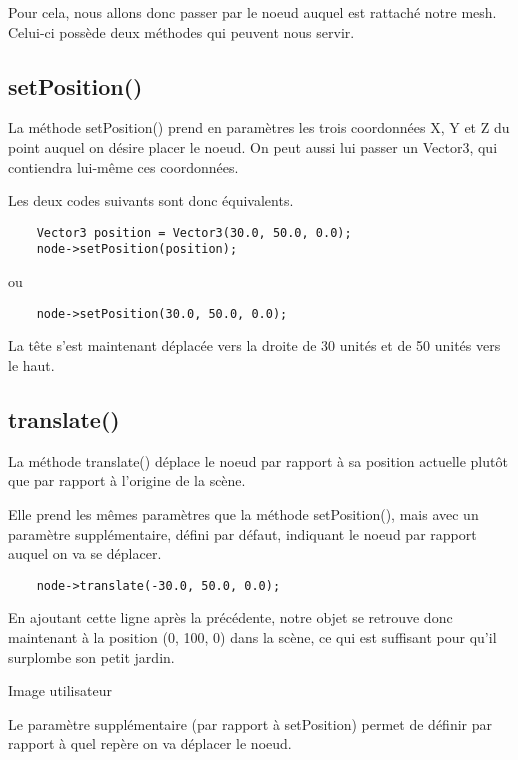 \documentclass[10pt,a4paper]{report}
\begin{document}
Pour cela, nous allons donc passer par le noeud auquel est rattach\'e notre mesh. Celui-ci poss\`ede deux m\'ethodes qui peuvent nous servir.




\subsection{setPosition()}

La m\'ethode setPosition() prend en param\`etres les trois coordonn\'ees X, Y et Z du point auquel on d\'esire placer le noeud. On peut aussi lui passer un Vector3, qui contiendra lui-m\^eme ces coordonn\'ees.

Les deux codes suivants sont donc \'equivalents.
\begin{lstlisting}
	Vector3 position = Vector3(30.0, 50.0, 0.0);
	node->setPosition(position);
\end{lstlisting}

ou
\begin{lstlisting}
	node->setPosition(30.0, 50.0, 0.0);
\end{lstlisting}

La t\^ete s'est maintenant d\'eplac\'ee vers la droite de 30 unit\'es et de 50 unit\'es vers le haut.




\subsection{translate()}

La m\'ethode translate() d\'eplace le noeud par rapport \`{a} sa position actuelle plut\^ot que par rapport \`{a} l'origine de la sc\`ene.

Elle prend les m\^emes param\`etres que la m\'ethode setPosition(), mais avec un param\`etre suppl\'ementaire, d\'efini par d\'efaut, indiquant le noeud par rapport auquel on va se d\'eplacer.
\begin{lstlisting}
	node->translate(-30.0, 50.0, 0.0);
\end{lstlisting}

En ajoutant cette ligne apr\`es la pr\'ec\'edente, notre objet se retrouve donc maintenant \`{a} la position (0, 100, 0) dans la sc\`ene, ce qui est suffisant pour qu'il surplombe son petit jardin.

Image utilisateur

Le param\`etre suppl\'ementaire (par rapport \`{a} setPosition) permet de d\'efinir par rapport \`{a} quel rep\`ere on va d\'eplacer le noeud.
\end{document}
